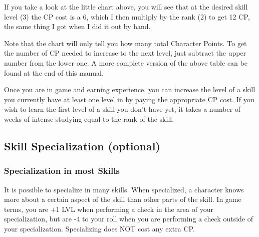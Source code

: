 \documentclass[twoside]{book}
\begin{document}
  
    {  
    If you take a look at the little chart above, you will
             see that at the desired skill level (3) the CP cost is a 6,
             which I then multiply by the rank (2) to get 12 CP, the same
             thing I got when I did it out by hand. 
    }
  
    {  
    Note that the chart will only tell you how many total
             Character Points. To get the number of CP needed to increase
             to the next level, just subtract the upper number from the
             lower one. A more complete version of the above table can be
             found at the end of this manual. 
    }
  
    {  
    Once you are in game and earning experience, you can
             increase the level of a skill you currently have at least
             one level in by paying the appropriate CP cost. If you wish
             to learn the first level of a skill you don't have
             yet, it takes a number of weeks of intense studying equal to
             the rank of the skill. 
    }
  
    

\subsection{Skill Specialization (optional)}
    
    

\subsubsection{Specialization in most Skills}
    
    {  
    It is possible to specialize in many skills. When
                 specialized, a character knows more about a certain
                 aspect of the skill than other parts of the skill. In
                 game terms, you are +1 LVL when performing a check in
                 the area of your specialization, but are -4 to your roll
                 when you are performing a check outside of your
                 specialization. Specializing does NOT cost any extra CP.
                 
    }
  
  

  
\end{document}
